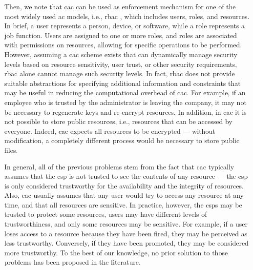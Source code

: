 Then, we note that \gls{cac} can be used as enforcement mechanism for one of the most widely used \gls{ac} models, i.e., \gls{rbac} \cite{cai_survey_2019}, which includes users, roles, and resources. In brief, a user represents a person, device, or software, while a role represents a job function. Users are assigned to one or more roles, and roles are associated with permissions on resources, allowing for specific operations to be performed. However, assuming a \gls{cac} scheme exists that can dynamically manage security levels based on resource sensitivity, user trust, or other security requirements, \gls{rbac} alone cannot manage such security levels. In fact, \gls{rbac} does not provide suitable abstractions for specifying additional information and constraints that may be useful in reducing the computational overhead of \gls{cac}.
For example, if an employee who is trusted by the administrator is leaving the company, it may not be necessary to regenerate keys and re-encrypt resources.
In addition, in \gls{cac} it is not possible to store public resources, i.e., resources that can be accessed by everyone. Indeed, \gls{cac} expects all resources to be encrypted --- without modification, a completely different process would be necessary to store public files.

In general, all of the previous problems stem from the fact that \gls{cac} typically assumes that the \gls{csp} is not trusted to see the contents of any resource --- the \gls{csp} is only considered trustworthy for the availability and the integrity of resources. Also, \gls{cac} usually assumes that any user would try to access any resource at any time, and that all resources are sensitive. In practice, however, the \glspl{csp} may be trusted to protect some resources, users may have different levels of trustworthiness, and only some resources may be sensitive. For example, if a user loses access to a resource because they have been fired, they may be perceived as less trustworthy. Conversely, if they have been promoted, they may be considered more trustworthy. To the best of our knowledge, no prior solution to those problems has been proposed in the literature.


